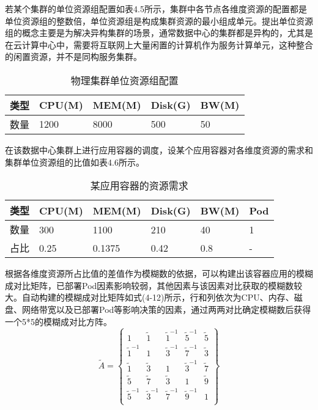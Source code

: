 若某个集群的单位资源组配置如表4.5所示，集群中各节点各维度资源的配置都是单位资源组的整数倍，单位资源组是构成集群资源的最小组成单元。提出单位资源组的概念主要是为解决异构集群的场景，通常数据中心的集群都是异构的，尤其是在云计算中心中，需要将互联网上大量闲置的计算机作为服务计算单元，这种整合的闲置资源，并不是同构服务集群。
\begin{table}[htbp]
	\centering\dawu[1.3]
	\caption{物理集群单位资源组配置}
	\begin{tabular}{|p{2cm}<{\centering}|p{2cm}<{\centering}|p{2cm}<{\centering}|p{2cm}<{\centering}|p{2cm}<{\centering}|} \hline
		类型 & CPU(M) & MEM(M) & Disk(G) & BW(M) \\ \hline
		数量 & 1200 & 8000 & 500 & 50  \\ \hline
	\end{tabular}
\end{table}

在该数据中心集群上进行应用容器的调度，设某个应用容器对各维度资源的需求和集群单位资源组的比值如表4.6所示。
\begin{table}[htbp]
	\centering\dawu[1.3]
	\caption{某应用容器的资源需求}
	\begin{tabular}{|p{1.8cm}<{\centering}|p{1.8cm}<{\centering}|p{1.8cm}<{\centering}|p{1.8cm}<{\centering}|p{1.8cm}<{\centering}|p{1.8cm}<{\centering}|} \hline
		类型 & CPU(M) & MEM(M) & Disk(G) & BW(M) & Pod \\ \hline
		数量 & 300 & 1100 & 210 & 40 & 1 \\ \hline
		占比 & 0.25 & 0.1375 & 0.42 & 0.8 & - \\ \hline
	\end{tabular}
\end{table}

根据各维度资源所占比值的差值作为模糊数的依据，可以构建出该容器应用的模糊成对比矩阵，已部署Pod因素影响较弱，其他因素与该因素对比获取的模糊数较大。自动构建的模糊成对比矩阵如式(4-12)所示，行和列依次为CPU、内存、磁盘、网络带宽以及已部署Pod等影响决策的因素，通过两两对比确定模糊数后获得一个5*5的模糊成对比方阵。
\begin{equation}
\widetilde{A} = \left\{\begin{array}{ccccc}
1 & \widetilde{1} & \widetilde{1}^{-1} & \widetilde{5}^{-1} & \widetilde{5}  \\
\widetilde{1}^{-1} & 1 & \widetilde{3}^{-1} & \widetilde{7}^{-1} & \widetilde{3} \\
\widetilde{1} & \widetilde{3} & 1 & \widetilde{3}^{-1} & \widetilde{7} \\
\widetilde{5} & \widetilde{7} & \widetilde{3} & 1 & \widetilde{9} \\
\widetilde{5}^{-1} & \widetilde{3}^{-1} & \widetilde{7}^{-1} & \widetilde{9}^{-1} & 1 \\
\end{array}\right\}
\end{equation}

